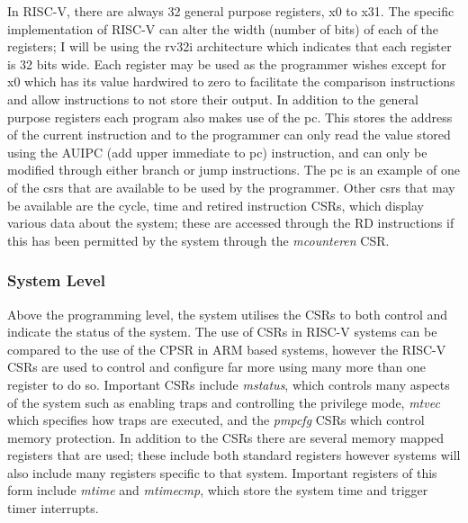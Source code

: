 In RISC-V, there are always 32 general purpose registers, x0 to x31. The specific implementation of RISC-V can alter the width (number of bits) of each of the registers; I will be using the rv32i architecture which indicates that each register is 32 bits wide. Each register may be used as the programmer wishes except for x0 which has its value hardwired to zero to facilitate the comparison instructions and allow instructions to not store their output. In addition to the general purpose registers each program also makes use of the \ac{pc}. This stores the address of the current instruction and to the programmer can only read the value stored using the AUIPC (add upper immediate to pc) instruction, and can only be modified through either branch or jump instructions. The pc is an example of one of the  \ac{csrs} that are available to be used by the programmer. Other \ac{csrs} that may be available are the cycle, time and retired instruction CSRs, which display various data about the system; these are accessed through the RD instructions if this has been permitted by the system through the \textit{mcounteren} CSR.
\subsubsection{System Level}
Above the programming level, the system utilises the CSRs to both control and indicate the status of the system. The use of CSRs in RISC-V systems can be compared to the use of the CPSR in ARM based systems, however the RISC-V CSRs are used to control and configure far more using many more than one register to do so. Important CSRs include \textit{mstatus}, which controls many aspects of the system such as enabling traps and controlling the privilege mode, \textit{mtvec} which specifies how traps are executed, and the \textit{pmpcfg} CSRs which control memory protection. In addition to the CSRs there are several memory mapped registers that are used; these include both standard registers however systems will also include many registers specific to that system. Important registers of this form include \textit{mtime} and \textit{mtimecmp}, which store the system time and trigger timer interrupts.
